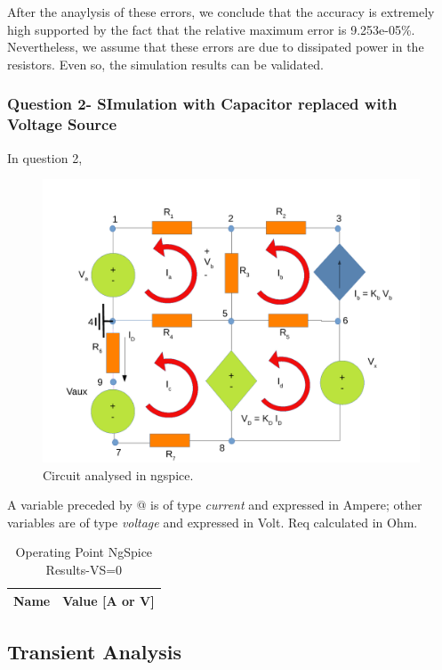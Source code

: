 After the anaylysis of these errors, we conclude that the accuracy is extremely high supported by the fact that the relative maximum error is 9.253e-05\%. Nevertheless, we assume that these errors are due to dissipated power in the resistors. Even so, the simulation results can be validated.


\subsubsection{Question 2- SImulation with Capacitor replaced with Voltage Source}
In question 2, 

\begin{figure}[ht] \centering
\includegraphics[width=1.0\linewidth]{sim2draw.pdf}
\caption{Circuit analysed in ngspice.}
\label{simdraw}
\end{figure}
A variable preceded by @ is of type {\em current} and expressed in Ampere; other variables are of type {\it voltage} and expressed in Volt. Req calculated in Ohm.
\begin{table}[ht]
  \centering
  \begin{tabular}{|l|r|}
    \hline    
    {\bf Name} & {\bf Value [A or V]} \\ \hline
    
  \end{tabular}
  \caption{Operating Point NgSpice Results-VS=0}
  \label{tab:op2}
\end{table}


\subsection{Transient Analysis}


